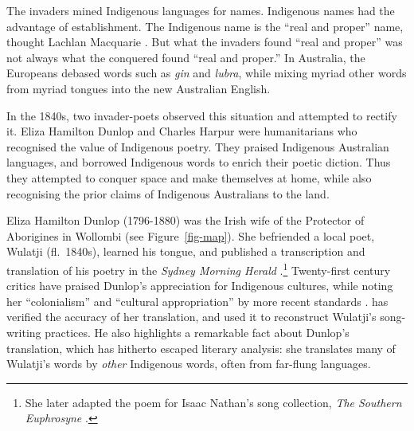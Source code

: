 \documentclass[
  Crown,
  times,
  sageh]{sagej}
\begin{document}
The invaders mined Indigenous languages for names. Indigenous names had
the advantage of establishment. The Indigenous name is the ``real and
proper'' name, thought Lachlan Macquarie \citep[quoted
in][328]{carter_road_2010}. But what the invaders found ``real and
proper'' was not always what the conquered found ``real and proper.'' In
Australia, the Europeans debased words such as \emph{gin} and
\emph{lubra}, while mixing myriad other words from myriad tongues into
the new Australian English.

In the 1840s, two invader-poets observed this situation and attempted to
rectify it. Eliza Hamilton Dunlop and Charles Harpur were humanitarians
who recognised the value of Indigenous poetry. They praised Indigenous
Australian languages, and borrowed Indigenous words to enrich their
poetic diction. Thus they attempted to conquer space and make themselves
at home, while also recognising the prior claims of Indigenous
Australians to the land.

Eliza Hamilton Dunlop (1796-1880) was the Irish wife of the Protector of
Aborigines in Wollombi (see Figure~\ref{fig-map}). She befriended a
local poet, Wulatji (fl.~1840s), learned his tongue, and published a
transcription and translation of his poetry in the \emph{Sydney Morning
Herald} \citep{wulatji_native_1848}.\footnote{She later adapted the poem
  for Isaac Nathan's song collection, \emph{The Southern Euphrosyne}
  \citep{dunlop_pialla_1848}.} Twenty-first century critics have praised
Dunlop's appreciation for Indigenous cultures, while noting her
``colonialism'' and ``cultural appropriation'' by more recent standards
\citep[47]{oleary_giving_2004, johnston_poetry_2021}.
\citet{wafer_ghost-writing_2017} has verified the accuracy of her
translation, and used it to reconstruct Wulatji's song-writing
practices. He also highlights a remarkable fact about Dunlop's
translation, which has hitherto escaped literary analysis: she
translates many of Wulatji's words by \emph{other} Indigenous words,
often from far-flung languages.
\end{document}
